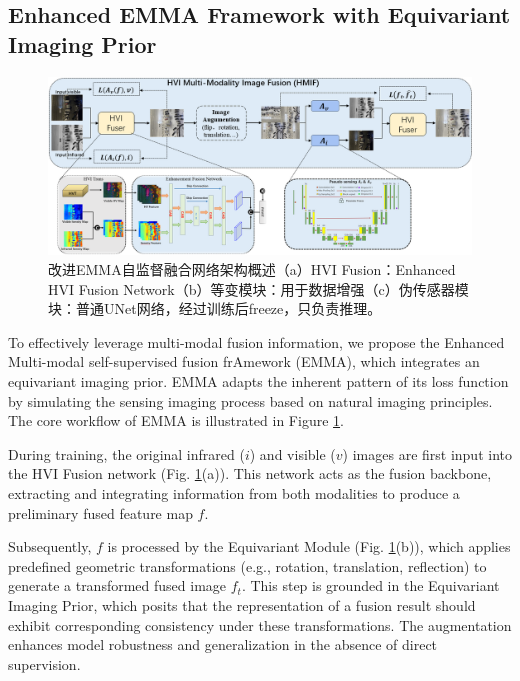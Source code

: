 \documentclass[journal]{IEEEtran}
\begin{document}
\subsection{Enhanced EMMA Framework with Equivariant Imaging Prior}
\label{ssec:maf}

\begin{figure}[!t]
    \centering
    \includegraphics[width=1.0\textwidth]{chapter and images/EMMA.png}
    \caption{改进EMMA自监督融合网络架构概述（a）HVI Fusion：Enhanced HVI Fusion Network（b）等变模块：用于数据增强（c）伪传感器模块：普通UNet网络，经过训练后freeze，只负责推理。}
    \label{fig:EMMA}
\end{figure}

To effectively leverage multi-modal fusion information, we propose the Enhanced Multi-modal self-supervised fusion frAmework (EMMA), which integrates an equivariant imaging prior. EMMA adapts the inherent pattern of its loss function by simulating the sensing imaging process based on natural imaging principles. The core workflow of EMMA is illustrated in Figure \ref{fig:EMMA}.

During training, the original infrared ($i$) and visible ($v$) images are first input into the HVI Fusion network (Fig. \ref{fig:EMMA}(a)). This network acts as the fusion backbone, extracting and integrating information from both modalities to produce a preliminary fused feature map $f$.

Subsequently, $f$ is processed by the Equivariant Module (Fig. \ref{fig:EMMA}(b)), which applies predefined geometric transformations (e.g., rotation, translation, reflection) to generate a transformed fused image $f_t$. This step is grounded in the Equivariant Imaging Prior, which posits that the representation of a fusion result should exhibit corresponding consistency under these transformations. The augmentation enhances model robustness and generalization in the absence of direct supervision.
\end{document}
